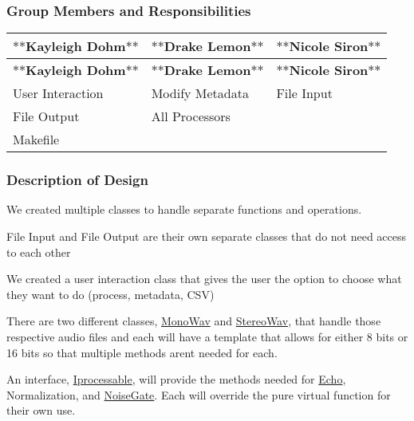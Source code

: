 \subsubsection*{Group Members and Responsibilities}

\tabulinesep=1mm
\begin{longtabu} spread 0pt [c]{*{3}{|X[-1]}|}
\hline
\rowcolor{\tableheadbgcolor}\textbf{ $\ast$$\ast$\+Kayleigh Dohm$\ast$$\ast$}&\textbf{ $\ast$$\ast$\+Drake Lemon$\ast$$\ast$}&\textbf{ $\ast$$\ast$\+Nicole Siron$\ast$$\ast$  }\\
\endfirsthead
\hline
\endfoot
\hline
\rowcolor{\tableheadbgcolor}\textbf{ $\ast$$\ast$\+Kayleigh Dohm$\ast$$\ast$}&\textbf{ $\ast$$\ast$\+Drake Lemon$\ast$$\ast$}&\textbf{ $\ast$$\ast$\+Nicole Siron$\ast$$\ast$  }\\
\endhead
User Interaction &Modify Metadata&File Input \\
File Output &All Processors &\\
Makefile &&\\
\end{longtabu}
\subsubsection*{Description of Design}


\begin{DoxyItemize}
\item We created multiple classes to handle separate functions and operations.
\item File Input and File Output are their own separate classes that do not need access to each other
\item We created a user interaction class that gives the user the option to choose what they want to do (process, metadata, C\+SV)
\item There are two different classes, \hyperlink{classMonoWav}{Mono\+Wav} and \hyperlink{classStereoWav}{Stereo\+Wav}, that handle those respective audio files and each will have a template that allows for either 8 bits or 16 bits so that multiple methods aren\textquotesingle{}t needed for each.
\item An interface, \hyperlink{classIprocessable}{Iprocessable}, will provide the methods needed for \hyperlink{classEcho}{Echo}, Normalization, and \hyperlink{classNoiseGate}{Noise\+Gate}. Each will override the pure virtual function for their own use.
\end{DoxyItemize}

